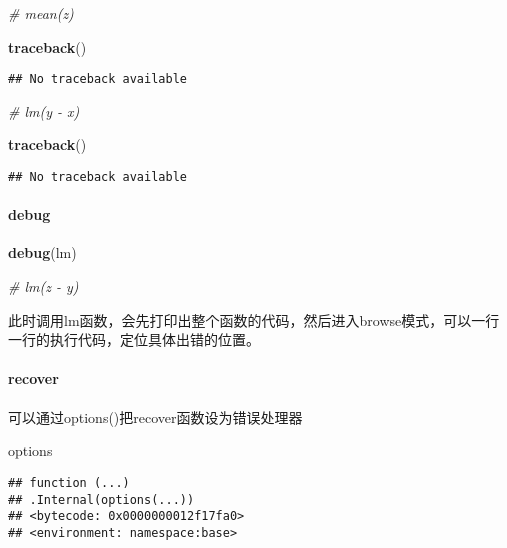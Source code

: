 \documentclass[
]{article}
\newenvironment{Shaded}{\begin{snugshade}}{\end{snugshade}}
\newcommand{\CommentTok}[1]{\textcolor[rgb]{0.56,0.35,0.01}{\textit{#1}}}
\newcommand{\KeywordTok}[1]{\textcolor[rgb]{0.13,0.29,0.53}{\textbf{#1}}}
\newcommand{\NormalTok}[1]{#1}
\begin{document}
\begin{Shaded}
\begin{Highlighting}[]
\CommentTok{\# mean(z)}
\end{Highlighting}
\end{Shaded}

\begin{Shaded}
\begin{Highlighting}[]
\KeywordTok{traceback}\NormalTok{()}
\end{Highlighting}
\end{Shaded}

\begin{verbatim}
## No traceback available
\end{verbatim}

\begin{Shaded}
\begin{Highlighting}[]
\CommentTok{\# lm(y {-} x)}
\end{Highlighting}
\end{Shaded}

\begin{Shaded}
\begin{Highlighting}[]
\KeywordTok{traceback}\NormalTok{()}
\end{Highlighting}
\end{Shaded}

\begin{verbatim}
## No traceback available
\end{verbatim}

\hypertarget{debug}{%
\paragraph{debug}\label{debug}}

\begin{Shaded}
\begin{Highlighting}[]
\KeywordTok{debug}\NormalTok{(lm)}
\end{Highlighting}
\end{Shaded}

\begin{Shaded}
\begin{Highlighting}[]
\CommentTok{\# lm(z {-} y)}
\end{Highlighting}
\end{Shaded}

此时调用lm函数，会先打印出整个函数的代码，然后进入browse模式，可以一行一行的执行代码，定位具体出错的位置。

\hypertarget{recover}{%
\paragraph{recover}\label{recover}}

可以通过options()把recover函数设为错误处理器

\begin{Shaded}
\begin{Highlighting}[]
\NormalTok{options}
\end{Highlighting}
\end{Shaded}

\begin{verbatim}
## function (...) 
## .Internal(options(...))
## <bytecode: 0x0000000012f17fa0>
## <environment: namespace:base>
\end{verbatim}
\end{document}
